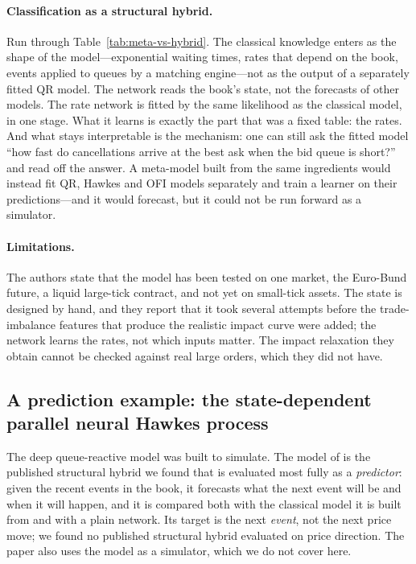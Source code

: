 \paragraph{Classification as a structural hybrid.} Run through
Table~\ref{tab:meta-vs-hybrid}. The classical knowledge enters as the shape of the model---exponential waiting
times, rates that depend on the book, events applied to queues by a matching engine---not as the output of a
separately fitted QR model. The network reads the book's state, not the forecasts of other models. The rate
network is fitted by the same likelihood as the classical model, in one stage. What it learns is exactly the
part that was a fixed table: the rates. And what stays interpretable is the mechanism: one can still ask the
fitted model ``how fast do cancellations arrive at the best ask when the bid queue is short?'' and read off the
answer. A meta-model built from the same ingredients would instead fit QR, Hawkes and OFI models separately and
train a learner on their predictions---and it would forecast, but it could not be run forward as a simulator.

\paragraph{Limitations.} The authors state that the model has been tested on one market, the
Euro-Bund future, a liquid large-tick contract, and not yet on small-tick assets. The state is designed by hand,
and they report that it took several attempts before the trade-imbalance features that produce the realistic
impact curve were added; the network learns the rates, not which inputs matter. The impact relaxation they
obtain cannot be checked against real large orders, which they did not have.

\subsection{A prediction example: the state-dependent parallel neural Hawkes process}
\label{sec:hybrid-pnhp}

The deep queue-reactive model was built to simulate. The model of \citet{shi2022sdpnhp} is the published structural hybrid we found that is evaluated most fully as a \emph{predictor}:
given the recent events in the book, it forecasts what the next event will be and when it will happen, and it
is compared both with the classical model it is built from and with a plain network. Its target is the next
\emph{event}, not the next price move; we found no published structural hybrid evaluated on price direction. The paper also uses the model as a simulator, which we do not cover here.

